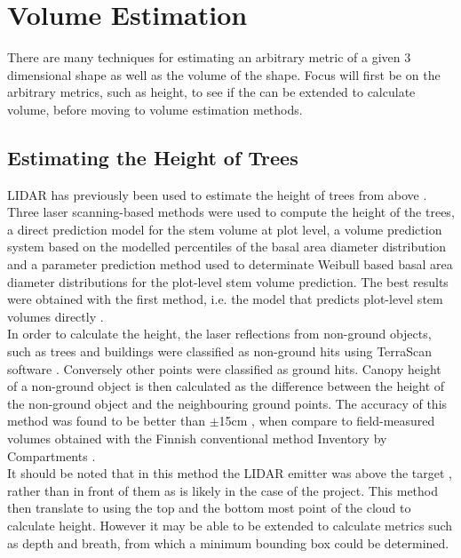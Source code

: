 \section{Volume Estimation}
\label{design:volume estimation}
There are many techniques for estimating an arbitrary metric of a given 3 dimensional shape as well as the volume of the shape.
Focus will first be on the arbitrary metrics, such as height, to see if the can be extended to calculate volume, before moving to volume estimation methods.\\

\subsection{Estimating the Height of Trees}
LIDAR has previously been used to estimate the height of trees from above \cite{Maltamo2006}. Three laser scanning-based methods were used to compute the height of the trees, a direct prediction model for the stem volume at plot level, a volume prediction system based on the modelled percentiles of the basal area diameter distribution and a parameter prediction method used to determinate Weibull based basal area diameter distributions \cite{Frechet1927} for the plot-level stem volume prediction. The best results were obtained with the first method, i.e. the model that predicts plot-level stem volumes directly \cite{Maltamo2006}.\\

In order to calculate the height, the laser reflections from non-ground objects, such as trees and buildings were classified as non-ground hits using TerraScan software \cite{Solid2013}. Conversely other points were classified as ground hits.
Canopy height of a non-ground object is then calculated as the difference between the height of the non-ground object and the neighbouring ground points. 
The accuracy of this method was found to be better than $\pm$15cm \cite{Maltamo2006}, when compare to field-measured volumes obtained with the Finnish conventional method Inventory by Compartments \cite{Koivuniemi2006}.\\

It should be noted that in this method the LIDAR emitter was above the target \cite{Maltamo2006}, rather than in front of them as is likely in the case of the project. This method then translate to using the top and the bottom most point of the cloud to calculate height. However it may be able to be extended to calculate metrics such as depth and breath, from which a minimum bounding box could be determined.\\

